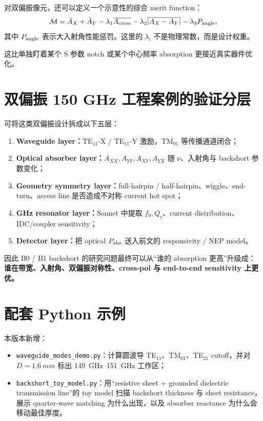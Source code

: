 \documentclass[11pt,a4paper,openany]{ctexrep}
\begin{document}
对双偏振像元，还可以定义一个示意性的综合 merit function：
\[
\mathcal M=
\bar A_X+\bar A_Y
-\lambda_1\overline{A_{\rm cross}}
-\lambda_2\overline{|A_X-A_Y|}
-\lambda_3 P_{\rm angle},
\]
其中 $P_{\rm angle}$ 表示大入射角性能惩罚。这里的 $\lambda_i$ 不是物理常数，而是设计权重。

这比单独盯着某个 S 参数 notch 或某个中心频率 absorption 更接近真实器件优化。

\section{双偏振 150 GHz 工程案例的验证分层}

\begin{projectbox}
可将这类双偏振设计拆成以下五层：
\begin{enumerate}
  \item \textbf{Waveguide layer：}TE$_{11}$-X / TE$_{11}$-Y 激励，TM$_{01}$ 等传播通道闭合；
  \item \textbf{Optical absorber layer：}$A_{XX},A_{YY},A_{XY},A_{YX}$ 随 $\nu$、入射角与 backshort 参数变化；
  \item \textbf{Geometry symmetry layer：}full-hairpin / half-hairpin、wiggle、end-turn、access line 是否造成不对称 current hot spot；
  \item \textbf{GHz resonator layer：}Sonnet 中提取 $f_0,Q_c$、current distribution、IDC/coupler sensitivity；
  \item \textbf{Detector layer：}把 optical $P_{\rm abs}$ 送入前文的 responsivity / NEP model。
\end{enumerate}
因此 B0 / B1 backshort 的研究问题最终可以从“谁的 absorption 更高”升级成：\textbf{谁在带宽、入射角、双偏振对称性、cross-pol 与 end-to-end sensitivity 上更优。}
\end{projectbox}

\section{配套 Python 示例}

本版本新增：
\begin{itemize}
  \item \texttt{waveguide\_modes\_demo.py}：计算圆波导 TE$_{11}$、TM$_{01}$、TE$_{21}$ cutoff，并对 $D=\SI{1.6}{mm}$ 标出 \SIrange{149}{151}{GHz} 工作区；
  \item \texttt{backshort\_toy\_model.py}：用“resistive sheet + grounded dielectric transmission line”的 toy model 扫描 backshort thickness 与 sheet resistance，展示 quarter-wave matching 为什么出现，以及 absorber reactance 为什么会移动最佳厚度。
\end{itemize}
\end{document}
